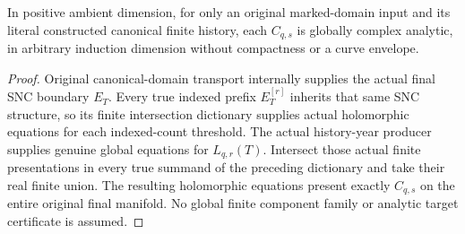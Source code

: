 \begin{theorem}
\label{hir:original-companion-chronological-count-global-analytic-producer}
\leanok
{}
In positive ambient dimension, for only an original marked-domain input and its literal constructed
canonical finite history, each $C_{q,s}$ is globally complex analytic,
in arbitrary induction dimension without compactness or a curve envelope.
\end{theorem}
\begin{proof}
Original canonical-domain transport internally supplies the actual final
SNC boundary $E_T$. Every true indexed prefix $E^{[r]}_T$ inherits that
same SNC structure, so its finite intersection dictionary supplies actual
holomorphic equations for each indexed-count threshold. The actual
history-year producer supplies genuine global equations for $L_{q,r}(T)$.
Intersect those actual finite presentations in every true summand of the
preceding dictionary and take their real finite union. The resulting
holomorphic equations present exactly $C_{q,s}$ on the entire original
final manifold. No global finite component family or analytic target
certificate is assumed.
\end{proof}

